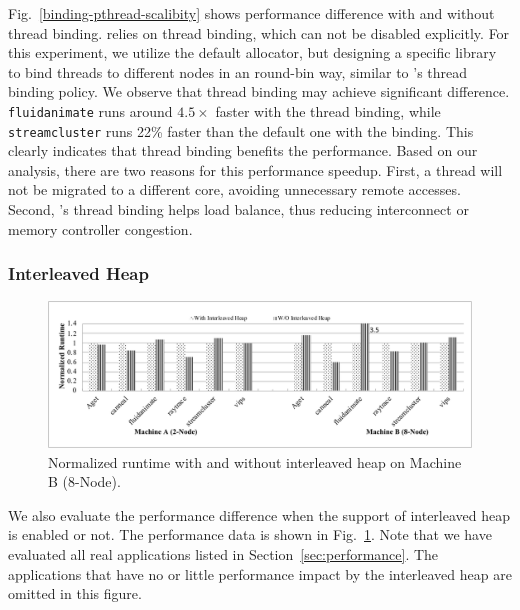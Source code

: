 Fig.~\ref{binding-pthread-scalibity} shows performance difference with and without thread binding. \NM{} relies on thread binding, which can not be disabled explicitly. For this experiment, we utilize the default allocator, but designing a specific library to bind threads to different nodes in an round-bin way, similar to \NM{}'s thread binding policy. We observe that thread binding may achieve significant difference. \texttt{fluidanimate} runs around $4.5\times$ faster with the thread binding, while  \texttt{streamcluster} runs 22\% faster than the default one with the binding. This clearly indicates that thread binding benefits the performance. Based on our analysis, there are two reasons for this performance speedup. First, a thread will not be migrated to a different core, avoiding unnecessary remote accesses. Second, \NM{}'s thread binding helps load balance, thus reducing interconnect or memory controller congestion.


\subsubsection{Interleaved Heap} 
\label{sec:interleavedheap}

\begin{figure}[H]
    \centering
    \includegraphics[width=\textwidth]{figure/interleavedheap.pdf}
    \caption{Normalized runtime with  and without interleaved heap on Machine B (8-Node).\label{fig:interleavedheap}}  
\end{figure}

We also evaluate the performance difference when the support of interleaved heap is enabled or not. The performance data is shown in Fig.~\ref{fig:interleavedheap}. Note that we have evaluated all real applications listed in Section~\ref{sec:performance}. The applications that have no or little performance impact by the interleaved heap are omitted in this figure. 

